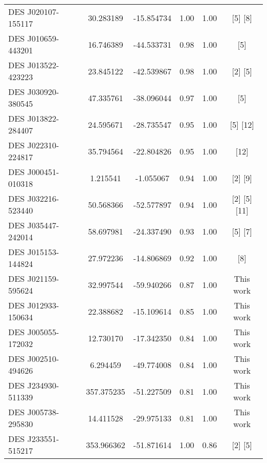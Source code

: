 \documentclass[tradiabstract,twocolumn]{aa}
\begin{document}
{\begin{longtable}{lccccc}
 DES J020107-155117 &   30.283189 & -15.854734 &      1.00 &                    1.00 &                       [5]  [8] \\
 DES J010659-443201 &   16.746389 & -44.533731 &      0.98 &                    1.00 &                            [5] \\
 DES J013522-423223 &   23.845122 & -42.539867 &      0.98 &                    1.00 &                       [2]  [5] \\
 DES J030920-380545 &   47.335761 & -38.096044 &      0.97 &                    1.00 &                            [5] \\
 DES J013822-284407 &   24.595671 & -28.735547 &      0.95 &                    1.00 &                      [5]  [12] \\
 DES J022310-224817 &   35.794564 & -22.804826 &      0.95 &                    1.00 &                           [12] \\
 DES J000451-010318 &    1.215541 &  -1.055067 &      0.94 &                    1.00 &                       [2]  [9] \\
 DES J032216-523440 &   50.568366 & -52.577897 &      0.94 &                    1.00 &                 [2]  [5]  [11] \\
 DES J035447-242014 &   58.697981 & -24.337490 &      0.93 &                    1.00 &                       [5]  [7] \\
 DES J015153-144824 &   27.972236 & -14.806869 &      0.92 &                    1.00 &                            [8] \\
 DES J021159-595624 &   32.997544 & -59.940266 &      0.87 &                    1.00 &                      This work \\
 DES J012933-150634 &   22.388682 & -15.109614 &      0.85 &                    1.00 &                      This work \\
 DES J005055-172032 &   12.730170 & -17.342350 &      0.84 &                    1.00 &                      This work \\
 DES J002510-494626 &    6.294459 & -49.774008 &      0.84 &                    1.00 &                      This work \\
 DES J234930-511339 &  357.375235 & -51.227509 &      0.81 &                    1.00 &                      This work \\
 DES J005738-295830 &   14.411528 & -29.975133 &      0.81 &                    1.00 &                      This work \\
 DES J233551-515217 &  353.966362 & -51.871614 &      1.00 &                    0.86 &                       [2]  [5] \\

\end{longtable}}
\end{document}

